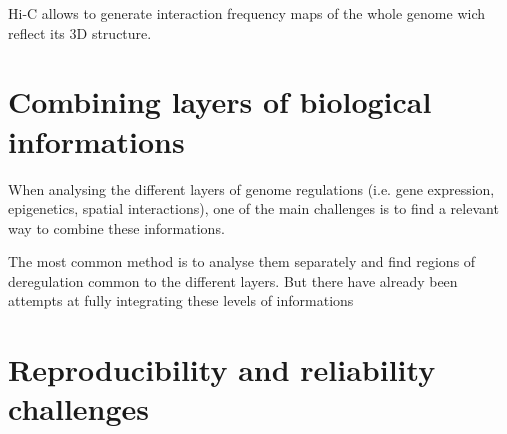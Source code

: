 Hi-C allows to generate interaction frequency maps of the whole genome wich reflect its 3D structure.

\section{Combining layers of biological informations}

When analysing the different layers of genome regulations (i.e. gene expression, epigenetics, spatial interactions), one of the main challenges is to find a relevant way to combine these informations. 

The most common method is to analyse them separately and find regions of deregulation common to the different layers. But there have already been attempts at fully integrating these levels of informations %


\section{Reproducibility and reliability challenges}
